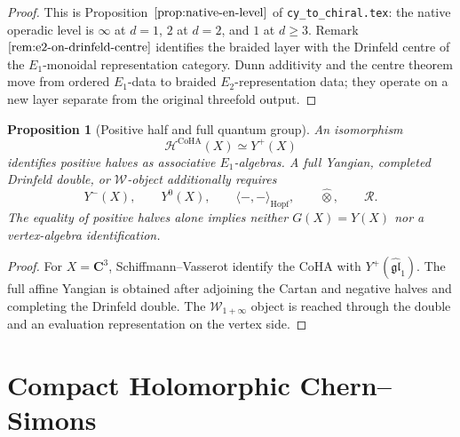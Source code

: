 \documentclass[11pt]{amsart}
\newtheorem{proposition}[theorem]{Proposition}
\theoremstyle{definition}
\providecommand{\CoHA}{\mathcal{H}^{\mathrm{CoHA}}}
\providecommand{\bC}{\mathbf{C}}
\providecommand{\Eone}{E_1}
\providecommand{\Etwo}{E_2}
\begin{document}
\begin{proof}
This is Proposition~\(\ref{prop:native-en-level}\) of
\texttt{cy\_to\_chiral.tex}: the native operadic level is
\(\infty\) at \(d=1\), \(2\) at \(d=2\), and \(1\) at \(d\geq3\).
Remark~\(\ref{rem:e2-on-drinfeld-centre}\) identifies the braided
layer with the Drinfeld centre of the \(\Eone\)-monoidal
representation category.  Dunn additivity and the centre theorem move
from ordered \(\Eone\)-data to braided \(\Etwo\)-representation data;
they operate on a new layer separate from the original threefold output.
\end{proof}

\begin{proposition}[Positive half and full quantum group]
\label{prop:positive-half-scope-GX}
An isomorphism
\[
  \CoHA(X)\simeq Y^+(X)
\]
identifies positive halves as associative \(\Eone\)-algebras.  A full
Yangian, completed Drinfeld double, or \(\mathcal W\)-object additionally
requires
\[
  Y^-(X),\qquad Y^0(X),\qquad
  \langle-,-\rangle_{\mathrm{Hopf}},\qquad
  \widehat{\otimes},\qquad
  \mathcal R.
\]
The equality of positive halves alone implies neither
\(G(X)=Y(X)\) nor a vertex-algebra identification.
\end{proposition}

\begin{proof}
For \(X=\bC^3\), Schiffmann--Vasserot identify the CoHA with
\(Y^+(\widehat{\mathfrak{gl}}_1)\).  The full affine Yangian is obtained
after adjoining the Cartan and negative halves and completing the
Drinfeld double.  The \(\mathcal W_{1+\infty}\) object is reached
through the double and an evaluation representation on the vertex side.
\end{proof}

\section{Compact Holomorphic Chern--Simons}
\end{document}
